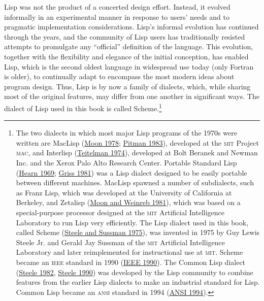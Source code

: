 \documentclass[8pt,oneside]{book}
\newcommand{\acronym}[1]{\textsc{\MakeLowercase{#1}}}
\newcommand{\link}[1]{\hyperref[#1]{#1}}
\begin{document}
Lisp was not the product of a concerted design effort.  Instead, it evolved
informally in an experimental manner in response to users' needs and to
pragmatic implementation considerations.  Lisp's informal evolution has
continued through the years, and the community of Lisp users has traditionally
resisted attempts to promulgate any ``official'' definition of the language.
This evolution, together with the flexibility and elegance of the initial
conception, has enabled Lisp, which is the second oldest language in widespread
use today (only Fortran is older), to continually adapt to encompass the most
modern ideas about program design.  Thus, Lisp is by now a family of dialects,
which, while sharing most of the original features, may differ from one another
in significant ways.  The dialect of Lisp used in this book is called
Scheme.\footnote{The two dialects in which most major Lisp programs of the
1970s were written are MacLisp (\link{Moon 1978}; \link{Pitman 1983}), developed at the
\acronym{MIT} Project \acronym{MAC}, and Interlisp (\link{Teitelman 1974}), developed
at Bolt Beranek and Newman Inc. and the Xerox Palo Alto Research Center.
Portable Standard Lisp (\link{Hearn 1969}; \link{Griss 1981}) was a Lisp dialect designed to
be easily portable between different machines.  MacLisp spawned a number of
subdialects, such as Franz Lisp, which was developed at the University of
California at Berkeley, and Zetalisp (\link{Moon and Weinreb 1981}), which was based on a
special-purpose processor designed at the \acronym{MIT} Artificial Intelligence
Laboratory to run Lisp very efficiently.  The Lisp dialect used in this book,
called Scheme (\link{Steele and Sussman 1975}), was invented in 1975 by Guy Lewis Steele Jr. and
Gerald Jay Sussman of the \acronym{MIT} Artificial Intelligence Laboratory and
later reimplemented for instructional use at \acronym{MIT}.  Scheme became an
\acronym{IEEE} standard in 1990 (\link{IEEE 1990}).  The Common Lisp dialect
(\link{Steele 1982}, \link{Steele 1990}) was developed by the Lisp community to combine
features from the earlier Lisp dialects to make an industrial standard for
Lisp.  Common Lisp became an \acronym{ANSI} standard in 1994 (\link{ANSI 1994}).}
\end{document}
